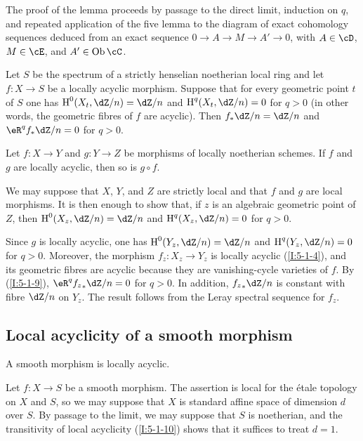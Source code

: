 The proof of the lemma proceeds by passage to the direct limit, induction
on $q$, and repeated application of the five lemma to the diagram of
exact cohomology sequences deduced from an exact sequence
$0\to A\to M\to A'\to0$, with $A\in\cD$, $M\in\cE$, and
$A'\in\ob\cC$.

\begin{corollary}\label{I:5-1-9}
Let $S$ be the spectrum of a strictly henselian noetherian local ring and
let $f:X\to S$ be a locally acyclic morphism. Suppose that for every
geometric point $t$ of $S$ one has $\h^0(X_t,\dZ/n)=\dZ/n$ and
$\h^q(X_t,\dZ/n)=0$ for $q>0$ (in other words, the geometric fibres of
$f$ are acyclic). Then $f_*\dZ/n=\dZ/n$ and
$\eR^qf_*\dZ/n=0$ for $q>0$.
\end{corollary}

\begin{corollary}\label{I:5-1-10}
Let $f:X\to Y$ and $g:Y\to Z$ be morphisms of locally noetherian
schemes. If $f$ and $g$ are locally acyclic, then so is $g\circ f$.
\end{corollary}

We may suppose that $X$, $Y$, and $Z$ are strictly local and that $f$
and $g$ are local morphisms. It is then enough to show that, if $z$ is
an algebraic geometric point of $Z$, then
$\h^0(X_z,\dZ/n)=\dZ/n$ and $\h^q(X_z,\dZ/n)=0$ for $q>0$.

Since $g$ is locally acyclic, one has $\h^0(Y_z,\dZ/n)=\dZ/n$ and
$\h^q(Y_z,\dZ/n)=0$ for $q>0$. Moreover, the morphism
$f_z:X_z\to Y_z$ is locally acyclic (\ref{I:5-1-4}), and its geometric
fibres are acyclic because they are vanishing-cycle varieties of $f$.
By (\ref{I:5-1-9}), $\eR^q{f_z}_*\dZ/n=0$ for $q>0$. In addition,
${f_z}_*\dZ/n$ is constant with fibre $\dZ/n$ on $Y_z$. The result
follows from the Leray spectral sequence for $f_z$.

\subsection{Local acyclicity of a smooth morphism}\label{I:5-2}

\begin{theorem}\label{I:5-2-1}
A smooth morphism is locally acyclic.
\end{theorem}

Let $f:X\to S$ be a smooth morphism. The assertion is local for the étale
topology on $X$ and $S$, so we may suppose that $X$ is standard affine
space of dimension $d$ over $S$. By passage to the limit, we may suppose
that $S$ is noetherian, and the transitivity of local acyclicity
(\ref{I:5-1-10}) shows that it suffices to treat $d=1$.

